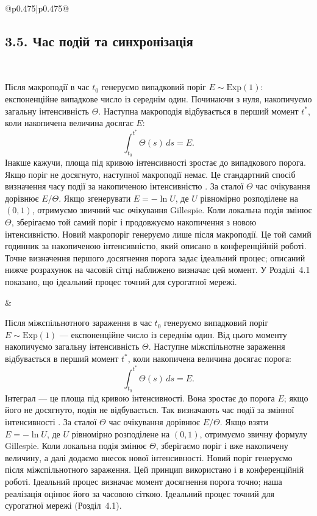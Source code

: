 ﻿\documentclass[11pt]{article}
\newcommand{\Exp}{\mathrm{Exp}}
\begin{document}
\begin{longtable}{@{}p{0.475\textwidth}|p{0.475\textwidth}@{}}
\begin{minipage}[t]{\linewidth}
\subsection*{3.5. Час подій та синхронізація}
\end{minipage} \\[5mm]
\begin{minipage}[t]{\linewidth}
Після макроподії в час $t_0$ генеруємо випадковий поріг $E\sim\Exp(1)$: експоненційне випадкове число із середнім один. Починаючи з нуля, накопичуємо загальну інтенсивність $\Theta$. Наступна макроподія відбувається в перший момент $t^\ast$, коли накопичена величина досягає $E$:
\begin{equation*}\int_{t_0}^{t^\ast}\Theta(s)\,ds=E.\tag{5}
\end{equation*}
Інакше кажучи, площа під кривою інтенсивності зростає до випадкового порога. Якщо поріг не досягнуто, наступної макроподії немає. Це стандартний спосіб визначення часу події за накопиченою інтенсивністю \citep{ethier1986,anderson2007}. За сталої $\Theta$ час очікування дорівнює $E/\Theta$. Якщо згенерувати $E=-\ln U$, де $U$ рівномірно розподілене на $(0,1)$, отримуємо звичний час очікування Gillespie. Коли локальна подія змінює $\Theta$, зберігаємо той самий поріг і продовжуємо накопичення з новою інтенсивністю. Новий макропоріг генеруємо лише після макроподії. Це той самий годинник за накопиченою інтенсивністю, який описано в конференційній роботі. Точне визначення першого досягнення порога задає ідеальний процес; описаний нижче розрахунок на часовій сітці наближено визначає цей момент. У Розділі~4.1 показано, що ідеальний процес точний для сурогатної мережі.
\end{minipage} &
\begin{minipage}[t]{\linewidth}
Після міжспільнотного зараження в час $t_0$ генеруємо випадковий поріг $E\sim\Exp(1)$ --- експоненційне число із середнім один. Від цього моменту накопичуємо загальну інтенсивність $\Theta$. Наступне міжспільнотне зараження відбувається в перший момент $t^\ast$, коли накопичена величина досягає порога:
\begin{equation*}\int_{t_0}^{t^\ast}\Theta(s)\,ds=E.\tag{5}
\end{equation*}
Інтеграл --- це площа під кривою інтенсивності. Вона зростає до порога $E$; якщо його не досягнуто, подія не відбувається. Так визначають час події за змінної інтенсивності \citep{ethier1986,anderson2007}. За сталої $\Theta$ час очікування дорівнює $E/\Theta$. Якщо взяти $E=-\ln U$, де $U$ рівномірно розподілене на $(0,1)$, отримуємо звичну формулу Gillespie. Коли локальна подія змінює $\Theta$, зберігаємо поріг і вже накопичену величину, а далі додаємо внесок нової інтенсивності. Новий поріг генеруємо після міжспільнотного зараження. Цей принцип використано і в конференційній роботі. Ідеальний процес визначає момент досягнення порога точно; наша реалізація оцінює його за часовою сіткою. Ідеальний процес точний для сурогатної мережі (Розділ~4.1).

\end{minipage}
\end{longtable}
\end{document}
